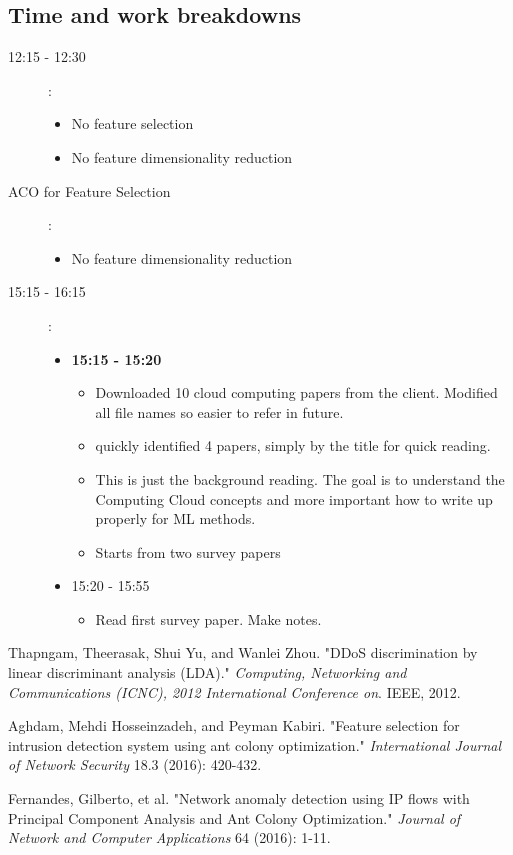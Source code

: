 \documentclass[a4paper]{article}
\begin{document}
\subsection{Time and work breakdowns}
\begin{description}
	\item [12:15 - 12:30]:
	\begin{itemize}
		\item No feature selection
		\item No feature dimensionality reduction
	\end{itemize}	 
	\item [ACO for Feature Selection \cite{aghdam2016feature}]:
	\begin{itemize}
		\item No feature dimensionality reduction
	\end{itemize}
	
	\item[15:15 - 16:15]:
	\begin{itemize}
		\item \textbf{15:15 - 15:20}
			\begin{itemize}
				\item Downloaded 10 cloud computing papers from the client. Modified all file names so easier to refer in future.
				\item quickly identified 4 papers, simply by the title for quick reading.
				\item This is just the background reading. The goal is to understand the Computing Cloud concepts and more important how to write up properly for ML methods.
				\item Starts from two survey papers
			\end{itemize}
		\item 15:20 - 15:55
		\begin{itemize}
			\item Read first survey paper. Make notes.
		\end{itemize} 
		 
	\end{itemize}
\end{description}





\begin{thebibliography}{99}

 Thapngam, Theerasak, Shui Yu, and Wanlei Zhou. "DDoS discrimination by linear discriminant analysis (LDA)." \textit{Computing, Networking and Communications (ICNC), 2012 International Conference on}. IEEE, 2012.

 Aghdam, Mehdi Hosseinzadeh, and Peyman Kabiri. "Feature selection for intrusion detection system using ant colony optimization." \textit{International Journal of Network Security} 18.3 (2016): 420-432.

 Fernandes, Gilberto, et al. "Network anomaly detection using IP flows with Principal Component Analysis and Ant Colony Optimization." \textit{Journal of Network and Computer Applications} 64 (2016): 1-11.

\end{thebibliography}
\end{document}
